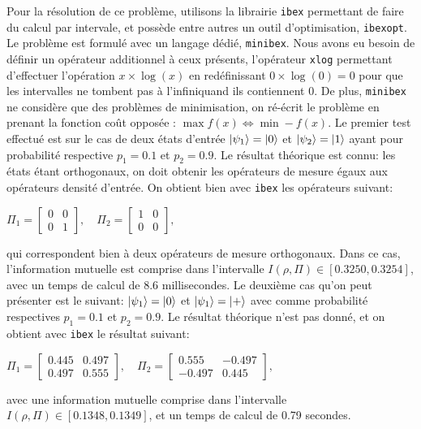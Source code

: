 Pour la résolution de ce problème, utilisons la librairie \texttt{ibex} permettant de faire du calcul par intervale, et possède entre autres un outil d'optimisation, \texttt{ibexopt}. Le problème est formulé avec un langage dédié, \texttt{minibex}. Nous avons eu besoin de définir un opérateur additionnel à ceux présents, l'opérateur \texttt{xlog} permettant d'effectuer l'opération $x \times \log(x)$ en redéfinissant $0 \times \log(0) = 0$ pour que les intervalles ne tombent pas à l'infiniquand ils contiennent 0. De plus, \texttt{minibex} ne considère que des problèmes de minimisation, on ré-écrit le problème en prenant la fonction coût opposée : $\max f(x) \Leftrightarrow \min -f(x)$.
\medbreak
Le premier test effectué est sur le cas de deux états d'entrée $\ket{\psi_1} = \ket{0}$ et $\ket{\psi_2} = \ket{1}$ ayant pour probabilité respective $p_1 = 0.1$ et $p_2 = 0.9$. Le résultat théorique est connu: les états étant orthogonaux, on doit obtenir les opérateurs de mesure égaux aux opérateurs densité d'entrée. On obtient bien avec \texttt{ibex} les opérateurs suivant:

$\Pi_1 = \begin{bmatrix} 0 & 0 \\ 0 & 1\end{bmatrix} , \quad \Pi_2 = \begin{bmatrix} 1 & 0 \\ 0 & 0\end{bmatrix},$

qui correspondent bien à deux opérateurs de mesure orthogonaux. Dans ce cas, l'information mutuelle est comprise dans l'intervalle $I(\rho, \Pi) \in [0.3250, 0.3254]$, avec un temps de calcul de 8.6 millisecondes.
\medbreak
Le deuxième cas qu'on peut présenter est le suivant: $\ket{\psi_1} = \ket{0}$ et $\ket{\psi_1} = \ket{+}$ avec comme probabilité respectives $p_1 = 0.1$ et $p_2 = 0.9$. Le résultat théorique n'est pas donné, et on obtient avec \texttt{ibex} le résultat suivant:

$\Pi_1 = \begin{bmatrix} 0.445 & 0.497 \\ 0.497 & 0.555\end{bmatrix} , \quad \Pi_2 = \begin{bmatrix} 0.555 & -0.497 \\ -0.497 & 0.445\end{bmatrix},$

avec une information mutuelle comprise dans l'intervalle $I(\rho, \Pi) \in [0.1348, 0.1349]$, et un temps de calcul de 0.79 secondes.

